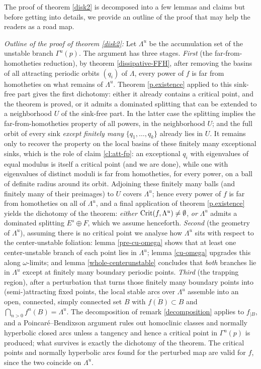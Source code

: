 \documentclass[a4paper,11pt]{article}
\theoremstyle{definition}
\def\La{\Lambda}
\def\Ga{\Gamma}
\def\La{\Lambda}
\def\Ga{\Gamma}
\begin{document}
\vskip 5pt



The proof of theorem \ref{disk2} is decomposed into a few lemmas and claims but before getting into details, we provide an outline of the proof that may help the readers as a road map.


\noindent \emph{Outline of the proof of theorem \ref{disk2}:} Let $\La^u$ be the accumulation set of the
unstable branch $\Ga^u(p)$. The argument has three stages. \emph{First}
(the far-from-homotheties reduction),  by theorem \ref{dissipative-FFH}, after removing the basins of
all attracting periodic orbits $(q_i)$ of $\La$, every power of $f$ is far
from homotheties on what remains of $\La^u$. Theorem \ref{p.existence}
applied to this sink-free part gives the first dichotomy: either it already
contains a critical point, and the theorem is proved, or it admits a
dominated splitting that can be extended to a neighborhood $U$
of the sink-free part. In the latter case the splitting implies the
far-from-homotheties property of all powers, in the neighborhood $U$; and the full orbit of every sink \emph{except
finitely many} $\{q_1,\dots,q_k\}$ already lies in $U$. It remains only to
recover the property on the local basins of these finitely many exceptional
sinks, which is the role of claim \ref{cl:att-fp}: an exceptional $q_i$ with
eigenvalues of equal modulus is itself a critical point (and we are done),
while one with eigenvalues of distinct moduli is far from homotheties, for
every power, on a ball of definite radius around its orbit. Adjoining these
finitely many balls (and finitely many of their preimages) to $U$ covers
$\La^u$; hence every power of $f$ is far from homotheties on all of $\La^u$,
and a final application of theorem \ref{p.existence} yields the dichotomy of
the theorem: \emph{either} ${\rm Crit}(f,\La^u)\neq\emptyset$, \emph{or}
$\La^u$ admits a dominated splitting $E^s\oplus F$, which we assume
henceforth. \emph{Second} (the geometry of $\La^u$),
assuming there is no critical point we analyse how $\La^u$ sits with respect
to the center-unstable foliation: lemma \ref{pre-cu-omega} shows that at
least one center-unstable branch of each point lies in $\La^u$; lemma
\ref{cu-omega} upgrades this along $\omega$-limits; and lemma
\ref{whole-centerunstable} concludes that \emph{both} branches lie in
$\La^u$ except at finitely many boundary periodic points. \emph{Third} (the
trapping region), after a perturbation that turns those finitely many
boundary points into (semi-)attracting fixed points, the local stable arcs
over $\La^u$ assemble into an open, connected, simply connected set $B$ with
$\overline{f(B)}\subset B$ and $\bigcap_{n>0}f^n(B)=\La^u$. The
decomposition of remark \ref{decomposition} applies to $f_{|B}$, and a
Poincar\'e--Bendixson argument rules out homoclinic classes and normally
hyperbolic closed arcs unless a tangency and hence a critical point in
$\Ga^u(p)$ is produced; what survives is exactly the dichotomy of the
theorem. The critical points and normally hyperbolic arcs found for the
perturbed map are valid for $f$, since the two coincide on $\La^u$.
\end{document}
